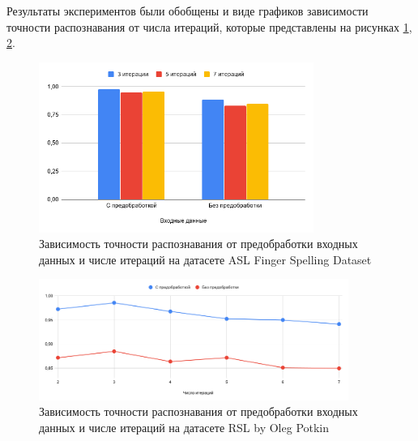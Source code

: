 Результаты экспериментов были обобщены и виде графиков зависимости точности распознавания от числа итераций, которые представлены на рисунках \ref{res:asl}, \ref{res:rsl_oleg}.

\begin{figure}
	\centering
	\includegraphics[width=0.8\textwidth]{inc/img/asl}
	\caption{Зависимость точности распознавания от предобработки входных данных и числе итераций на датасете ASL Finger Spelling Dataset}
	\label{res:asl}
\end{figure}


\begin{figure}
	\centering
	\includegraphics[width=0.9\textwidth]{inc/img/rsl_oleg}
	\caption{Зависимость точности распознавания от предобработки входных данных и числе итераций на датасете RSL by Oleg Potkin}
	\label{res:rsl_oleg}
\end{figure}

